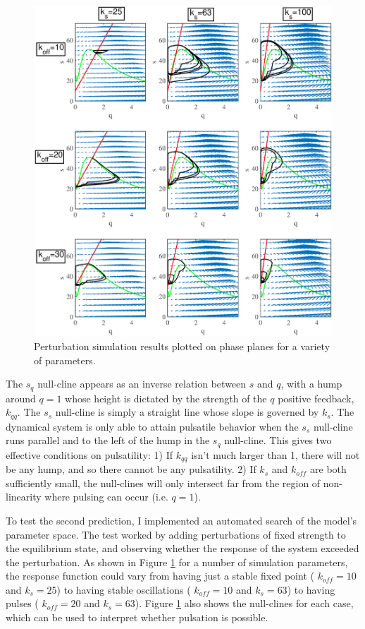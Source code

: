 \begin{figure}[h!]
	\centering
	\includegraphics[width=\hsize]{pulse/phase_tester.eps}
	\caption{\label{fig:pulse_test}  Perturbation simulation results plotted on phase planes for a variety of parameters.  }
\end{figure}

The $s_q$ null-cline appears as an inverse relation between $s$ and $q$, with a hump around $q=1$ whose height is dictated by the strength of the $q$ positive feedback, $k_{qq}$.  The $s_s$ null-cline is simply a straight line whose slope is governed by $k_s$.  The dynamical system is only able to attain pulsatile behavior when the $s_s$ null-cline runs parallel and to the left of the hump in the $s_q$ null-cline.  This gives two effective conditions on pulsatility: 1) If $k_{qq}$ isn't much larger than 1, there will not be any hump, and so there cannot be any pulsatility. 2) If $k_s$ and $k_{off}$ are both sufficiently small, the null-clines will only intersect far from the region of non-linearity where pulsing can occur (i.e. $q=1$).

To test the second prediction, I implemented an automated search of the model's parameter space.  The test worked by adding perturbations of fixed strength to the equilibrium state, and observing whether the response of the system exceeded the perturbation. As shown in Figure \ref{fig:pulse_test} for a number of simulation parameters, the response function could vary from having just a stable fixed point ( $k_{off}=10$ and $k_s=25$) to having stable oscillations ( $k_{off}=10$ and $k_s=63$) to having pulses ( $k_{off}=20$ and $k_s=63$).  Figure \ref{fig:pulse_test} also shows the null-clines for each case, which can be used to interpret whether pulsation is possible.

